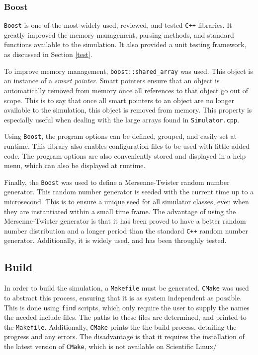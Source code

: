 \documentclass[a4paper,11pt]{article}
\begin{document}

\subsubsection{Boost}

\texttt{Boost} is one of the most widely used, reviewed, and tested \texttt{C++} libraries.  It greatly improved the memory management, parsing methods, and standard functions  available to the simulation.   It also provided a unit testing framework, as discussed in Section \ref{test}.  

To improve memory management, \texttt{boost::shared\_array} was used.  This object is an instance of a \emph{smart pointer}.  Smart pointers ensure that an object is automatically removed from memory once all references to that object go out of scope.  This is to say that once all smart pointers to an object are no longer available to the simulation, this object is removed from memory.  This property is especially useful when dealing with the large arrays found in \texttt{Simulator.cpp}.  

Using \texttt{Boost}, the program options can be defined, grouped, and easily set at runtime.  This library also enables configuration files to be used with little added code.  The program options are also conveniently stored and displayed in a help menu, which can also be displayed at runtime.  

Finally, the \texttt{Boost} was used to define a Mersenne-Twister random number generator.  This random number generator is seeded with the current time up to a microsecond.  This is to ensure a unique seed for all simulator classes, even when they are instantiated within a small time frame.  The advantage of using the Mersenne-Twister generator is that it has been proved to have a better random number distribution and a longer period than the standard \texttt{C++} random number generator.  Additionally, it is widely used, and has been throughly tested.

\subsection{Build}

In order to build the simulation, a \texttt{Makefile} must be generated.  \texttt{CMake} was used to abstract this process, ensuring that it is as system independent as possible.   This is done using \texttt{find} scripts, which only require the user to supply the names the needed include files.  The paths to these files are determined, and printed to the \texttt{Makefile}.  Additionally, \texttt{CMake} prints the the build process, detailing the progress and any errors.  The disadvantage is that it requires the installation of the latest version of \texttt{CMake}, which is not available on Scientific Linux/  
\end{document}
